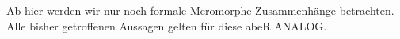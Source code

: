 \begin{comment}
  Quellen:\\
  sabbah\_cimpa90 seite 28 / 30
\end{comment}

Ab hier werden wir nur noch formale Meromorphe Zusammenhänge betrachten. Alle
bisher getroffenen Aussagen gelten für diese abeR ANALOG.

\begin{comment}
  Sei $M_{\hat{K}}=\cD_{\hat{K}}/\cD_{\hat{K}}\cdot P$ und nehme an, dass $N(P)$
  zumindes 2 nichttriviale Steigungen hat. Spalte $N(P)=N_1\dot\cup N_2$ in 2
  Teile. Dann gilt:

  \begin{lem}
    Es existiert eine Aufteilung $P=P_1P_2$ mit:
    \begin{itemize}
      \item $N(P_1)\subset N_1$ und $N(P_2)\subset N_2$
      \item A ist eine kante von ...
    \end{itemize}
  \end{lem}
\end{comment}

\begin{thm}
  \cite[Thm 5.3.1]{sabbah_cimpa90}
\end{thm}

